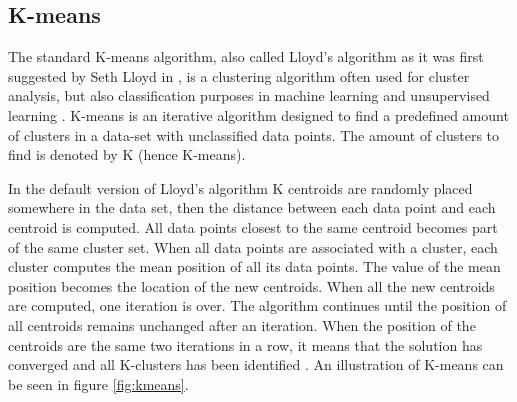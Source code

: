 



\subsection{K-means}
The standard K-means algorithm, also called Lloyd's algorithm as it was first suggested by Seth Lloyd in \cite{sloyd}, is a clustering algorithm often used for cluster analysis, but also classification purposes in machine learning and unsupervised learning \cite{Coates2012}. K-means is an iterative algorithm designed to find a predefined amount of clusters in a data-set with unclassified data points. The amount of clusters to find is denoted by
K (hence K-means). 

In the default version of Lloyd's algorithm K centroids are randomly placed somewhere in the data set, then the distance between each data point and each centroid is computed. All data points
closest to the same centroid becomes part of the same cluster set. When all data points are associated with a cluster, each cluster computes the mean position of all its data points.
The value of the mean position becomes the location of the new centroids. When all the new centroids are computed, one iteration is over. The algorithm continues until the position 
of all centroids remains unchanged after an iteration. When the position of the centroids are the same two iterations in a row, it means that the solution has converged and all K-clusters has been identified \cite{mackaymeans}. An illustration of K-means can be seen in figure \ref{fig:kmeans}. 

